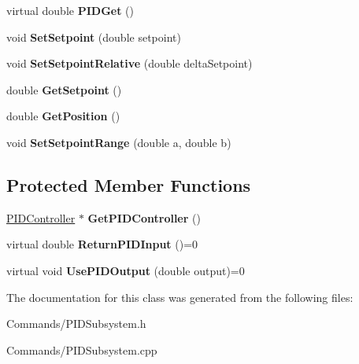 \begin{DoxyCompactItemize}
\item 
\hypertarget{classPIDSubsystem_a5fcbfb3ca1e53fe9c91efba1771ffb15}{
virtual double {\bfseries PIDGet} ()}
\label{classPIDSubsystem_a5fcbfb3ca1e53fe9c91efba1771ffb15}

\item 
\hypertarget{classPIDSubsystem_a87323aaa4b95fe9dc544157f04f66867}{
void {\bfseries SetSetpoint} (double setpoint)}
\label{classPIDSubsystem_a87323aaa4b95fe9dc544157f04f66867}

\item 
\hypertarget{classPIDSubsystem_aca4dcf990caeff9dcbc0d8c66d476316}{
void {\bfseries SetSetpointRelative} (double deltaSetpoint)}
\label{classPIDSubsystem_aca4dcf990caeff9dcbc0d8c66d476316}

\item 
\hypertarget{classPIDSubsystem_a0d319cc2a1b26128376c51d66a9e0ca4}{
double {\bfseries GetSetpoint} ()}
\label{classPIDSubsystem_a0d319cc2a1b26128376c51d66a9e0ca4}

\item 
\hypertarget{classPIDSubsystem_af646dedfa2c6ed7355a9242be65d844a}{
double {\bfseries GetPosition} ()}
\label{classPIDSubsystem_af646dedfa2c6ed7355a9242be65d844a}

\item 
\hypertarget{classPIDSubsystem_a6a254fb684669b4e33a553650ae2ae91}{
void {\bfseries SetSetpointRange} (double a, double b)}
\label{classPIDSubsystem_a6a254fb684669b4e33a553650ae2ae91}

\end{DoxyCompactItemize}
\subsection*{Protected Member Functions}
\begin{DoxyCompactItemize}
\item 
\hypertarget{classPIDSubsystem_abc33f5534d764995fd769ccfd4dc51a7}{
\hyperlink{classPIDController}{PIDController} $\ast$ {\bfseries GetPIDController} ()}
\label{classPIDSubsystem_abc33f5534d764995fd769ccfd4dc51a7}

\item 
\hypertarget{classPIDSubsystem_a53cc637e0f64f37031e238ca785dd3e0}{
virtual double {\bfseries ReturnPIDInput} ()=0}
\label{classPIDSubsystem_a53cc637e0f64f37031e238ca785dd3e0}

\item 
\hypertarget{classPIDSubsystem_a6a374b62609ebb1979e43b136658e4ef}{
virtual void {\bfseries UsePIDOutput} (double output)=0}
\label{classPIDSubsystem_a6a374b62609ebb1979e43b136658e4ef}

\end{DoxyCompactItemize}


The documentation for this class was generated from the following files:\begin{DoxyCompactItemize}
\item 
Commands/PIDSubsystem.h\item 
Commands/PIDSubsystem.cpp\end{DoxyCompactItemize}
